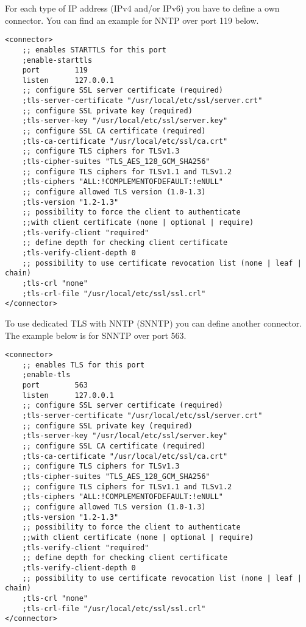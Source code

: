 \documentclass[12pt,fleqn,leqno]{scrbook}
\begin{document}
For each type of IP address (IPv4 and/or IPv6) you have to define a own
connector. You can find an example for NNTP over port 119 below.

\begin{verbatim}
<connector>
    ;; enables STARTTLS for this port
    ;enable-starttls
    port        119
    listen      127.0.0.1
    ;; configure SSL server certificate (required)
    ;tls-server-certificate "/usr/local/etc/ssl/server.crt"
    ;; configure SSL private key (required)
    ;tls-server-key "/usr/local/etc/ssl/server.key"
    ;; configure SSL CA certificate (required)
    ;tls-ca-certificate "/usr/local/etc/ssl/ca.crt"
    ;; configure TLS ciphers for TLSv1.3
    ;tls-cipher-suites "TLS_AES_128_GCM_SHA256"
    ;; configure TLS ciphers for TLSv1.1 and TLSv1.2
    ;tls-ciphers "ALL:!COMPLEMENTOFDEFAULT:!eNULL"
    ;; configure allowed TLS version (1.0-1.3)
    ;tls-version "1.2-1.3"
    ;; possibility to force the client to authenticate 
    ;;with client certificate (none | optional | require)
    ;tls-verify-client "required"
    ;; define depth for checking client certificate
    ;tls-verify-client-depth 0
    ;; possibility to use certificate revocation list (none | leaf | chain)
    ;tls-crl "none"
    ;tls-crl-file "/usr/local/etc/ssl/ssl.crl"
</connector>
\end{verbatim}

To use dedicated TLS with NNTP (SNNTP) you can define another connector.
The example below is for SNNTP over port 563.

\begin{verbatim}
<connector>
    ;; enables TLS for this port
    ;enable-tls
    port        563
    listen      127.0.0.1
    ;; configure SSL server certificate (required)
    ;tls-server-certificate "/usr/local/etc/ssl/server.crt"
    ;; configure SSL private key (required)
    ;tls-server-key "/usr/local/etc/ssl/server.key"
    ;; configure SSL CA certificate (required)
    ;tls-ca-certificate "/usr/local/etc/ssl/ca.crt"
    ;; configure TLS ciphers for TLSv1.3
    ;tls-cipher-suites "TLS_AES_128_GCM_SHA256"
    ;; configure TLS ciphers for TLSv1.1 and TLSv1.2
    ;tls-ciphers "ALL:!COMPLEMENTOFDEFAULT:!eNULL"
    ;; configure allowed TLS version (1.0-1.3)
    ;tls-version "1.2-1.3"
    ;; possibility to force the client to authenticate 
    ;;with client certificate (none | optional | require)
    ;tls-verify-client "required"
    ;; define depth for checking client certificate
    ;tls-verify-client-depth 0
    ;; possibility to use certificate revocation list (none | leaf | chain)
    ;tls-crl "none"
    ;tls-crl-file "/usr/local/etc/ssl/ssl.crl"
</connector>
\end{verbatim}
\end{document}
